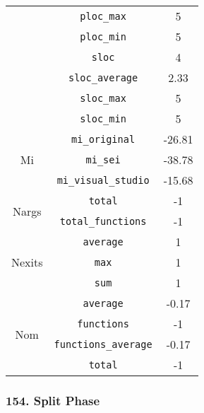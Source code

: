 \begin{center}
\begin{tabular}{ |c|c|c| }
          & \verb|ploc_max|                       & 5          \\
          & \verb|ploc_min|                       & 5          \\
          & \verb|sloc|                           & 4          \\
          & \verb|sloc_average|                   & 2.33       \\
          & \verb|sloc_max|                       & 5          \\
          & \verb|sloc_min|                       & 5          \\
    \hline
    \multirow{ 3 }{6em}{ Mi }
          & \verb|mi_original|                    & -26.81     \\
          & \verb|mi_sei|                         & -38.78     \\
          & \verb|mi_visual_studio|               & -15.68     \\
    \hline
    \multirow{ 2 }{6em}{ Nargs }
          & \verb|total|                          & -1         \\
          & \verb|total_functions|                & -1         \\
    \hline
    \multirow{ 3 }{6em}{ Nexits }
          & \verb|average|                        & 1          \\
          & \verb|max|                            & 1          \\
          & \verb|sum|                            & 1          \\
    \hline
    \multirow{ 4 }{6em}{ Nom }
          & \verb|average|                        & -0.17      \\
          & \verb|functions|                      & -1         \\
          & \verb|functions_average|              & -0.17      \\
          & \verb|total|                          & -1         \\
    \hline
  \end{tabular}
\end{center}
\subsubsection{ 154. Split Phase }

